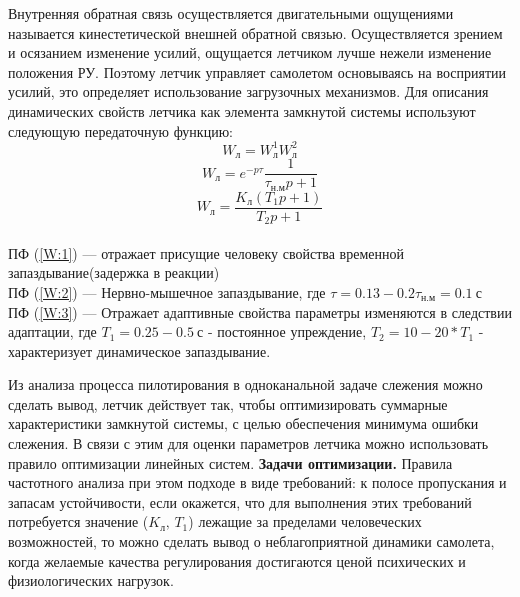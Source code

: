 \documentclass{article}
\begin{document}
Внутренняя обратная связь осуществляется двигательными ощущениями называется
кинестетической внешней обратной связью. Осуществляется зрением и осязанием
изменение усилий, ощущается летчиком лучше нежели изменение положения РУ.
Поэтому летчик управляет самолетом основываясь на восприятии усилий, это
определяет использование загрузочных механизмов. Для описания динамических
свойств летчика как элемента замкнутой системы используют следующую
передаточную функцию:
\begin{equation} \label{W:1}
	W_\text{л} = W_\text{л}^1 W_\text{л}^2
\end{equation}
\begin{equation} \label{W:2}
	W_\text{л} = e^{-p\tau} \frac{1}{\tau_\text{н.м} p +1}
\end{equation}
\begin{equation} \label{W:3}
	W_\text{л} = \frac{K_\text{л}(T_1 p + 1)}{T_2 p +1}
\end{equation}\\
ПФ (\ref{W:1}) --- отражает присущие человеку свойства временной
запаздывание(задержка в реакции)\\
ПФ (\ref{W:2}) --- Нервно-мышечное запаздывание, где $\tau = 0.13 - 0.2
	\tau_\text{н.м}= 0.1 \ \text{с}$ \\
ПФ (\ref{W:3}) --- Отражает адаптивные свойства параметры изменяются в
следствии адаптации, где $T_1 = 0.25 - 0.5 \ \text{с}$ - постоянное упреждение,
$T_2 = 10 - 20 * T_1$ - характеризует динамическое запаздывание.

Из анализа процесса пилотирования в одноканальной задаче слежения можно сделать
вывод, летчик действует так, чтобы оптимизировать суммарные характеристики
замкнутой системы, с целью обеспечения минимума ошибки слежения. В связи с этим
для оценки параметров летчика можно использовать правило оптимизации линейных
систем.
\textbf{Задачи оптимизации.} Правила частотного анализа при этом подходе в виде
требований: к полосе пропускания и запасам устойчивости, если окажется, что для
выполнения этих требований потребуется значение ($K_\text{л}, \, T_1$) лежащие
за пределами человеческих возможностей, то можно сделать вывод о
неблагоприятной динамики самолета, когда желаемые качества регулирования
достигаются ценой психических и физиологических нагрузок.
\end{document}
